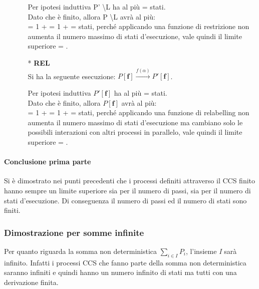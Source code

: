 \begin{itemize}
\begin{itemize}
		Per ipotesi induttiva  P' \textbackslash L ha al più  =  stati. \\
		Dato che  è finito, allora P \textbackslash L avrà al più: \\
		 = 1 +  = 1 +  =  stati, perché applicando una funzione di restrizione non aumenta il numero massimo di stati d'esecuzione, vale quindi il limite superiore  = .
			\\
		\item[*] \textbf{REL}
		\\
		Si ha la seguente esecuzione: $P \mathbf{[f]} \overset{f(\alpha)}\rightarrow P'\mathbf{[f]}$. 
		
		Per ipotesi induttiva  $P'\mathbf{[f]}$ ha al più  =  stati. \\
		Dato che  è finito, allora $P \mathbf{[f]}$ avrà al più: \\
		 = 1 +  = 1 +  =  stati, perché applicando una funzione di relabelling non aumenta il numero massimo di stati d'esecuzione ma cambiano solo le possibili interazioni con altri processi in parallelo, vale quindi il limite superiore  = .
		
	\end{itemize}
\end{itemize}
\pagebreak
\paragraph{Conclusione prima parte} \mbox{}

Si è dimostrato nei punti precedenti che i processi definiti attraverso il CCS finito hanno sempre un limite superiore sia per il numero di passi, sia per il numero di stati d'esecuzione. Di conseguenza il numero di passi ed il numero di stati sono finiti.

\subsubsection{Dimostrazione per somme infinite}
Per quanto riguarda la somma non deterministica $\displaystyle\sum_{i\in I}^{}P_{i}$, l'insieme \textit{I} sarà infinito. Infatti i processi CCS che fanno parte della somma non deterministica saranno infiniti e quindi hanno un numero infinito di stati ma tutti con una derivazione finita.

